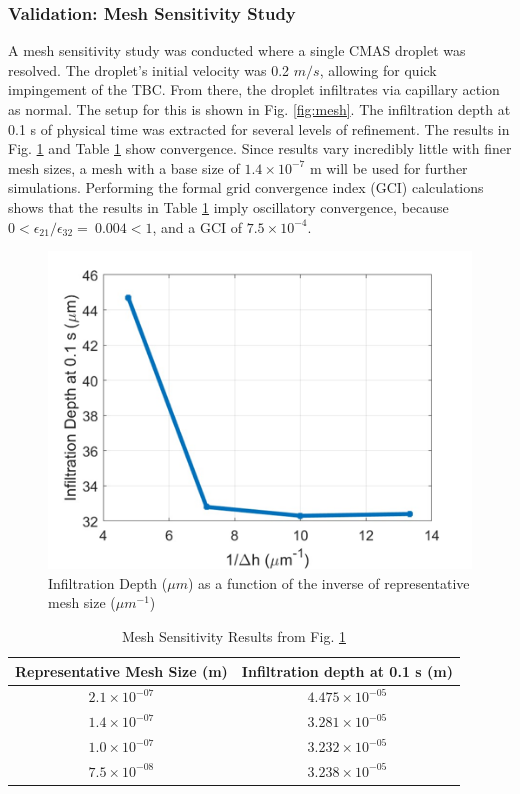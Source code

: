 \documentclass[%
 aip,
 amsmath,amssymb,
 reprint,%
floatfix]{revtex4-1}
\begin{document}
\subsubsection{Validation: Mesh Sensitivity Study}
A mesh sensitivity study was conducted where a single CMAS droplet was resolved. The droplet's initial velocity was 0.2 $m/s$, allowing for quick impingement of the TBC. From there, the droplet infiltrates via capillary action as normal. The setup for this is shown in Fig. \ref{fig:mesh}. The infiltration depth at 0.1 s of physical time was extracted for several levels of refinement. The results in Fig. \ref{fig:meshSensResults} and Table \ref{tab:meshSensResults} show convergence. Since results vary incredibly little with finer mesh sizes, a mesh with a base size of ${1.4\times 10^{-7}}$ m will be used for further simulations. Performing the formal grid convergence index (GCI) calculations \cite{ECA2014104, celik2008procedure} shows that the results in Table \ref{tab:meshSensResults} imply oscillatory convergence, because  $0<\epsilon_{21}/\epsilon_{32}=\ 0.004<1$, and a GCI of $7.5\times 10^{-4}$.



\begin{figure}
    \centering
    \includegraphics[width=\linewidth]{Figures/infilDepthMesh.png}
    \caption{Infiltration Depth ($\mu m$) as a function of the inverse of representative mesh size ($\mu m ^{-1}$)}
    \label{fig:meshSensResults}
\end{figure}

\begin{table}
    \centering
    \caption{Mesh Sensitivity Results from Fig. \ref{fig:meshSensResults}}
    \begin{tabular}{c|c}
       Representative Mesh Size (m)  & Infiltration depth at 0.1 s (m) \\
       \hline
        $2.1\times10^{-07}$ & $4.475\times10^{-05}$ \\
        $1.4\times10^{-07}$ & $3.281\times10^{-05}$ \\
        $1.0\times10^{-07}$ & $3.232\times10^{-05}$ \\
        $7.5\times10^{-08}$ & $3.238\times10^{-05}$
    \end{tabular}
    \label{tab:meshSensResults}
\end{table}
\end{document}
